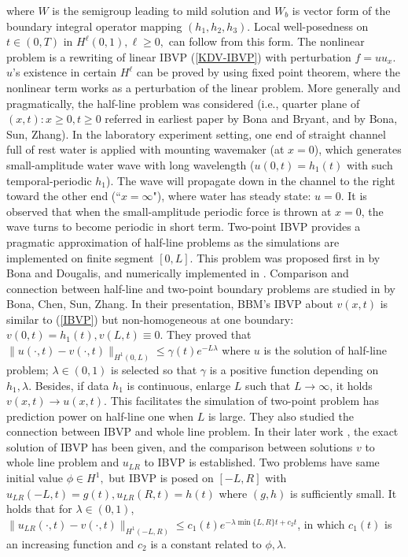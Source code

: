 \documentclass[10pt,a4paper,final]{article}
\numberwithin{equation}{section}
\begin{document}
\noindent where $W$ is the semigroup leading to mild solution and $W_b$ is vector form of the boundary integral operator mapping $(h_1, h_2, h_3)$. Local well-posedness on $t\in(0, T)$ in $H^\ell(0, 1), \ell\ge 0,$ can follow from this form. The nonlinear problem is a rewriting of linear IBVP (\ref{KDV-IBVP}) with perturbation $f=uu_x$. $u$'s existence in certain $H^\ell$ can be proved by using fixed point theorem, where the nonlinear term works as a perturbation of the linear problem. More generally and pragmatically, the half-line problem was considered (i.e., quarter plane of $(x, t): x\ge 0, t\ge 0$ referred in earliest paper \cite{BB} by Bona and Bryant, and \cite{BSZ1, BSZ4} by Bona, Sun, Zhang). In the laboratory experiment setting, one end of straight channel full of rest water is applied with mounting wavemaker (at $x=0$), which generates small-amplitude water wave with long wavelength ($u(0,t)=h_1(t)$ with such temporal-periodic $h_1$). The wave will propagate down in the channel to the right toward the other end (``$x=\infty$"), where water has steady state: $u=0$. It is observed that when the small-amplitude periodic force is thrown at $x=0$, the wave turns to become periodic in short term. Two-point IBVP provides a pragmatic approximation of half-line problems as the simulations are implemented on finite segment $[0, L]$. This problem was proposed first in \cite{BD} by Bona and Dougalis, and numerically implemented in \cite{BPS}. Comparison and connection between half-line and two-point boundary problems are studied in \cite{BCSZ} by Bona, Chen, Sun, Zhang. In their presentation, BBM's IBVP about $v(x,t)$ is similar to (\ref{IBVP}) but non-homogeneous at one boundary: $v(0, t)=h_1(t), v(L, t)\equiv 0. $ They proved that $\|u(\cdot, t)-v(\cdot, t)\|_{H^1(0, L)}\le \gamma(t)e^{-L\lambda}$ where $u$ is the solution of half-line problem; $\lambda\in(0,1)$ is selected so that $\gamma$ is a positive function depending on $h_1, \lambda$. Besides, if data $h_1$ is continuous, enlarge $L$ such that $L\rightarrow \infty$, it holds $v(x,t)\rightarrow u(x,t)$. This facilitates the simulation of two-point problem has prediction power on half-line one when $L$ is large. They also studied the connection between IBVP and whole line problem. In their later work \cite{BCSZ2}, the exact solution of IBVP has been given, and the comparison between solutions $v$ to whole line problem and $u_{LR}$ to IBVP is established. Two problems have same initial value $\phi\in H^1,$ but IBVP is posed on $[-L, R]$ with $u_{LR}(-L, t)=g(t), u_{LR}(R, t)=h(t)$ where $(g, h)$ is sufficiently small. It holds that for $\lambda\in(0,1)$, $\|u_{LR}(\cdot, t)-v(\cdot, t)\|_{H^1(-L,R)}\le c_1(t)e^{-\lambda\min\{L, R\}t+c_2t}$, in which $c_1(t)$ is an increasing function and $c_2$ is a constant related to $\phi, \lambda$.\\
\end{document}
